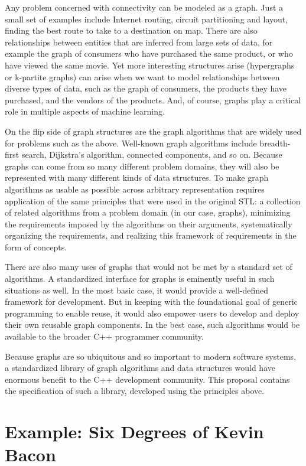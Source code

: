 Any problem concerned with connectivity can be modeled as a graph.  
Just a small set of examples include
Internet routing, circuit partitioning and layout, finding the best route to take to a destination on map.
There are also relationships between entities that are inferred from large sets of data, for example the graph of consumers who have purchased the same product, or who have viewed the same movie.
Yet more interesting structures arise (hypergraphs or k-partite graphs) can arise when we want to model relationships between diverse types of data, such as the graph of consumers, the products they have purchased, and the vendors of the products.
And, of course, graphs play a critical role in multiple aspects of machine learning.

On the flip side of graph structures are the graph algorithms that are widely used for problems such as the above.
Well-known graph algorithms include breadth-first search, Dijkstra's algorithm, connected components, and so on.
%
Because graphs can come from so many different problem domains, they will also be represented with many different kinds of data structures.
To make graph algorithms as usable as possible across arbitrary representation requires application of the same principles that were used in the original STL: 
a collection of related algorithms from a problem domain (in our case, graphs),
minimizing the requirements imposed by the algorithms on their arguments,
systematically organizing the requirements, and
realizing this framework of requirements in the form of concepts.

There are also many uses of graphs that would not be met by a standard set of algorithms.  A standardized interface for graphs is eminently useful in such situations as well.  
In the most basic case, it would provide a well-defined framework for development.  But in keeping with the foundational goal of generic programming to enable reuse, it would also empower users to develop and deploy their own reusable graph components.  In the best case, such algorithms would be available to the broader C++ programmer community.

Because graphs are so ubiquitous and so important to modern software systems, a standardized library of graph algorithms and data structures would have enormous benefit to the C++ development community.
This proposal contains the specification of such a library, developed using the principles above.



\section{Example: Six Degrees of Kevin Bacon}
\label{sec:bacon}

